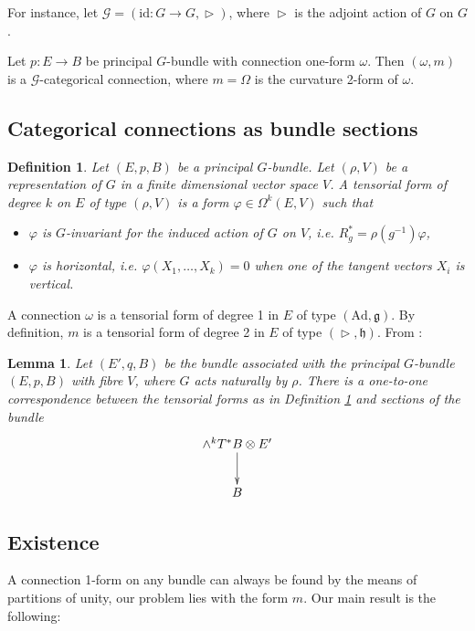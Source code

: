 \documentclass[11pt,a4]{article} %
\newtheorem{definition}[theorem]{Definition}
\newtheorem{lemma}[theorem]{Lemma}
\newcommand{\define}[1]{\index{#1}\emph{#1}}
\begin{document}
For instance, let $\mathcal{G}=(\text{id}:G\rightarrow G,\vartriangleright)$, where $\vartriangleright$ is the adjoint action of $G$ on $G$.

Let $p:E\rightarrow B$ be principal $G$-bundle with connection one-form $\omega$. Then $(\omega,m)$ is a $\mathcal{G}$-categorical connection, where $m=\Omega$ is the curvature 2-form of $\omega$.                                         

\subsection{Categorical connections as bundle sections}
\begin{definition}\label{tensdef}
Let $(E,p,B)$ be a principal $G$-bundle. Let $(\rho,V)$ be a representation of $G$ in a finite dimensional vector space $V$. A \define{tensorial form} of degree $k$ on $E$ of type $(\rho,V)$ is a form $\varphi\in\Omega^k (E,V)$ such that
\begin{itemize}
\item $\varphi$ is $G$-invariant for the induced action of $G$ on $V$, i.e. $R_g^*=\rho(g^{-1})\varphi$,
\item $\varphi$ is horizontal, i.e. $\varphi(X_1,\ldots,X_k)=0$ when one of the tangent vectors $X_i$ is vertical.
\end{itemize}
\end{definition}

A connection $\omega$ is a tensorial form of degree 1 in $E$ of type $(\text{Ad},\mathfrak{g})$. By definition, $m$ is a tensorial form of degree 2 in $E$ of type $(\vartriangleright,\mathfrak{h})$. From \cite{kobayashi1}:

\begin{lemma}\label{tensorialform}
Let $(E',q,B)$ be the bundle associated with the principal $G$-bundle $(E,p,B)$ with fibre $V$, where $G$ acts naturally by $\rho$. There is a one-to-one correspondence between the tensorial forms as in Definition \ref{tensdef} and sections of the bundle \[
\xymatrix{\wedge^k T^*B\otimes E' \ar[d]\\
B} \]
\end{lemma}

\subsection{Existence}
A connection 1-form on any bundle can always be found by the means of partitions of unity, our problem lies with the form $m$. Our main result is the following:
\end{document}

